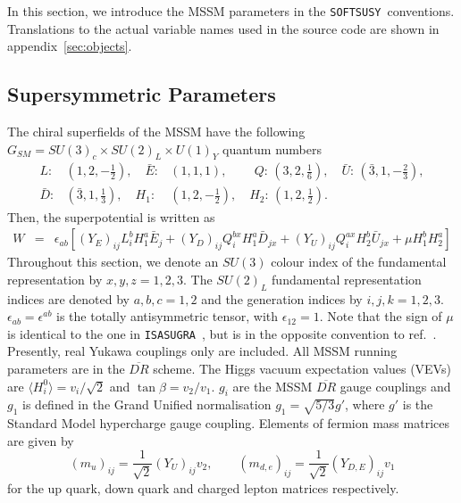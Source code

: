 \documentclass{article}
\def\SOFTSUSY{{\tt SOFTSUSY}}
\def\ISAJET{{\tt ISASUGRA}}
\def\half{\frac{1}{2}}
\begin{document}
In this section, we introduce the MSSM parameters in the
\SOFTSUSY~conventions. Translations to the actual variable names used in the
source code are shown in appendix~\ref{sec:objects}.

\subsection{Supersymmetric Parameters \label{susypars}}
The chiral superfields of the MSSM have the 
following $G_{SM}=SU(3)_c\times SU(2)_L\times U(1)_Y$ quantum numbers
\begin{eqnarray}
L:&(1,2,-\half),\quad {\bar E}:&(1,1,1),\qquad\, Q:\,(3,2,\frac{1}{6}),\quad
{\bar U}:\,({\bar 3},1,-\frac{2}{3}),\nonumber\\ {\bar D}:&({\bar 3},1,\frac{1}{3}),\quad
H_1:&(1,2,-\half),\quad  H_2:\,(1,2,\half).
\label{fields}
\end{eqnarray}
Then, the superpotential is written as
\begin{eqnarray}
W&=& \epsilon_{ab} \left[ (Y_E)_{ij} L_i^b
H_1^a {\bar E}_j + (Y_D)_{ij} Q_i^{bx} H_1^a {\bar D}_{jx} +
(Y_U)_{ij} Q_i^{ax} H_2^b {\bar U}_{jx}  + \mu  H_1^b H_2^a\right]
\label{superpot}
\end{eqnarray}
Throughout this section, we denote an $SU(3)$ colour index of the
fundamental representation by 
$x,y,z=1,2,3$. The $SU(2)_L$ fundamental representation indices are
denoted by $a,b,c=1,2$ and the generation indices by $i,j,k=1,2,3$.
$\epsilon_{ab}=\epsilon^{ab}$ is the totally antisymmetric tensor, with
$\epsilon_{12}=1$. 
Note that the sign of $\mu$ is identical to the one in 
\ISAJET~\cite{Baer:1999sp},
but is in the opposite convention to ref.~\cite{Pierce:1997zz}.
Presently, real Yukawa couplings only are included.
All MSSM running parameters are
in the $\overline{DR}$ scheme. The Higgs vacuum expectation values (VEVs) are
$\langle H_i^0 \rangle = v_i / \sqrt{2}$ and
$\tan\beta=v_2/v_1$. $g_i$ are the MSSM $\overline{DR}$ gauge couplings and 
$g_1$ is defined in the Grand Unified normalisation $g_1 = \sqrt{5/3} g'$,
where $g'$ is the Standard Model hypercharge gauge coupling.
Elements of fermion mass matrices are given by
\begin{equation} \label{yuksaway}
(m_u)_{ij} = \frac{1}{\sqrt{2}} (Y_U)_{ij} v_2, \qquad 
(m_{d,e})_{ij} = \frac{1}{\sqrt{2}} (Y_{D,E})_{ij} v_1
\end{equation}
for the up quark, down quark and charged lepton matrices respectively.
\end{document}
